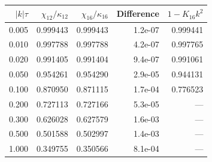 \begin{tabular}{rrrrr}\toprule
$|k|\tau$ & $\chi_{12}/\kappa_{12}$ & $\chi_{16}/\kappa_{16}$ & Difference & $1-K_{16}k^2$\\\midrule
0.005 & 0.999443 & 0.999443 & 1.2e-07 & 0.999441 \\
0.010 & 0.997788 & 0.997788 & 4.2e-07 & 0.997765 \\
0.020 & 0.991405 & 0.991404 & 9.4e-07 & 0.991061 \\
0.050 & 0.954261 & 0.954290 & 2.9e-05 & 0.944131 \\
0.100 & 0.870950 & 0.871115 & 1.7e-04 & 0.776523 \\
0.200 & 0.727113 & 0.727166 & 5.3e-05 & --- \\
0.300 & 0.626028 & 0.627579 & 1.6e-03 & --- \\
0.500 & 0.501588 & 0.502997 & 1.4e-03 & --- \\
1.000 & 0.349755 & 0.350566 & 8.1e-04 & --- \\
\bottomrule\end{tabular}
